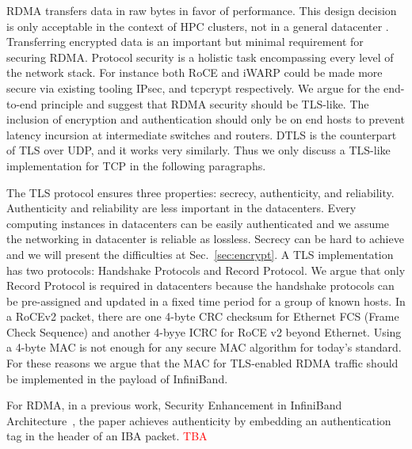 RDMA transfers data in raw bytes in favor of performance. This design decision
is only acceptable in the context of HPC clusters, not in a general datacenter .
Transferring encrypted data is an important but minimal requirement for securing
RDMA.  Protocol security is a holistic task encompassing every level of the
network stack. For instance both RoCE and iWARP could be made more secure via
existing tooling IPsec, and tcpcrypt respectively.  We argue for the end-to-end
principle and suggest that RDMA security should be TLS-like.  The inclusion of
encryption and authentication should only be on end hosts to prevent latency
incursion at intermediate switches and routers. DTLS is the counterpart of TLS
over UDP, and it works very similarly. Thus we only discuss a TLS-like
implementation for TCP in the following paragraphs.

The TLS protocol ensures three properties: secrecy, authenticity, and
reliability. Authenticity and reliability are less important in the datacenters.
Every computing instances in datacenters can be easily authenticated and we
assume the networking in datacenter is reliable as lossless. Secrecy can be hard
to achieve and we will present the difficulties at Sec.~\ref{sec:encrypt}. A TLS
implementation has two protocols: Handshake Protocols and Record Protocol. We
argue that only Record Protocol is required in datacenters because the handshake
protocols can be pre-assigned and updated in a fixed time period for a group of
known hosts. In a RoCEv2 packet, there are one 4-byte CRC checksum for Ethernet
FCS (Frame Check Sequence) and another 4-byye ICRC for RoCE v2 beyond Ethernet.
Using a 4-byte MAC is not enough for any secure MAC algorithm for today's
standard. For these reasons we argue that the MAC for TLS-enabled RDMA traffic
should be implemented in the payload of InfiniBand.

For RDMA, in a previous work, Security Enhancement in InfiniBand
Architecture~\cite{Lee:2005:SEI:1053727.1054449}, the paper achieves
authenticity by embedding an authentication tag in the header of an IBA packet.
\textcolor{red}{TBA}
